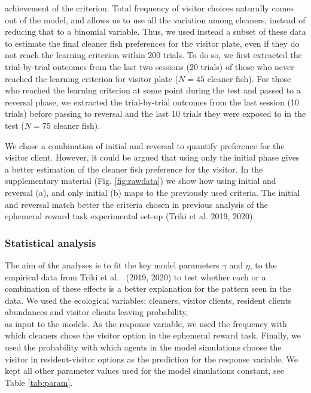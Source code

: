 \documentclass[
  12pt,
]{article}
\begin{document}
achievement of the criterion. Total frequency of visitor choices
naturally comes out of the model, and allows us to use all the variation
among cleaners, instead of reducing that to a binomial variable. Thus,
we used instead a subset of these data to estimate the final cleaner
fish preferences for the visitor plate, even if they do not reach the
learning criterion within 200 trials. To do so, we first extracted the
trial-by-trial outcomes from the last two sessions (20 trials) of those
who never reached the learning criterion for visitor plate (\(N = 45\)
cleaner fish). For those who reached the learning criterion at some
point during the test and passed to a reversal phase, we extracted the
trial-by-trial outcomes from the last session (10 trials) before passing
to reversal and the last 10 trials they were exposed to in the test
(\(N = 75\) cleaner fish).

We chose a combination of initial and reversal to quantify preference
for the visitor client. However, it could be argued that using only the
initial phase gives a better estimation of the cleaner fish preference
for the visitor. In the supplementary material (Fig. \ref{fig:rawdata})
we show how using initial and reversal (a), and only initial (b) maps to
the previously used criteria. The initial and reversal match better the
criteria chosen in previous analysis of the ephemeral reward task
experimental set-up (Triki et al. 2019, 2020).

\hypertarget{statistical-analysis}{%
\subsubsection{Statistical analysis}\label{statistical-analysis}}

The aim of the analyses is to fit the key model parameters \(\gamma\)
and \(\eta\), to the empirical data from Triki et al.~ (2019, 2020) to
test whether each or a combination of these effects is a better
explanation for the pattern seen in the data. We used the ecological
variables: cleaners, visitor clients, resident clients abundances and
visitor clients leaving probability,\\
as input to the models. As the response variable, we used the frequency
with which cleaners chose the visitor option in the ephemeral reward
task. Finally, we used the probability with which agents in the model
simulations choose the visitor in resident-visitor options as the
prediction for the response variable. We kept all other parameter values
used for the model simulations constant, see Table \ref{tab:param}.
\end{document}
